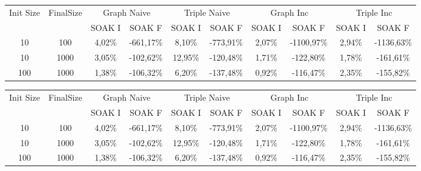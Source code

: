 \begin{sidewaystable}
	\begin{tabular}{|c|c|cc|cc|cc|cc|} %
	  	\hline
		Init Size&FinalSize &\multicolumn{2}{c}{Graph Naive}  &\multicolumn{2}{c}{Triple Naive}&\multicolumn{2}{c}{Graph Inc}  &\multicolumn{2}{c}{Triple Inc}\\\
		&& SOAK I & SOAK F& SOAK I & SOAK F& SOAK I & SOAK F& SOAK I & SOAK F\\
		\hline
		\hline
		10	&100	&4,02\%&\cellcolor[HTML]{C0C0C0}	-661,17\%&	8,10\%&\cellcolor[HTML]{C0C0C0}-773,91\%&	2,07\%&	\cellcolor[HTML]{C0C0C0}-1100,97\%&	2,94\%&\cellcolor[HTML]{C0C0C0}	-1136,63\%\\	
		10	&1000	&3,05\%&\cellcolor[HTML]{C0C0C0}	-102,62\%&	12,95\%&\cellcolor[HTML]{C0C0C0}	-120,48\%&	1,71\%&	\cellcolor[HTML]{C0C0C0}-122,80\%&	1,78\%&\cellcolor[HTML]{C0C0C0}-161,61\%	\\
		100	&1000&	1,38\%&\cellcolor[HTML]{C0C0C0}-106,32\%&	6,20\%&\cellcolor[HTML]{C0C0C0}-137,48\%&	0,92\%&\cellcolor[HTML]{C0C0C0}-116,47\%&	2,35\%&	\cellcolor[HTML]{C0C0C0}-155,82\%	\\

		\hline %
	\end{tabular}
	\caption[\textsc{Analyser} Investigation Stack - Level 1 - SOAK Test Average Latency Comparison]{Max Latency Comparison Step Response}
	\label{tab:step_latency_comparisons_max}
	

	\begin{tabular}{|c|c|cc|cc|cc|cc|} %
	  	\hline
		Init Size&FinalSize &\multicolumn{2}{c}{Graph Naive}  &\multicolumn{2}{c}{Triple Naive}&\multicolumn{2}{c}{Graph Inc}  &\multicolumn{2}{c}{Triple Inc}\\\
		&& SOAK I & SOAK F& SOAK I & SOAK F& SOAK I & SOAK F& SOAK I & SOAK F\\
		\hline
		\hline
		10	&100	&4,02\%&\cellcolor[HTML]{C0C0C0}	-661,17\%&	8,10\%&\cellcolor[HTML]{C0C0C0}	-773,91\%&	2,07\%&	\cellcolor[HTML]{C0C0C0}-1100,97\%&	2,94\%&\cellcolor[HTML]{C0C0C0}	-1136,63\%\\	
		10	&1000	&3,05\%&	\cellcolor[HTML]{C0C0C0}-102,62\%&	12,95\%&	\cellcolor[HTML]{C0C0C0}-120,48\%&	1,71\%&	\cellcolor[HTML]{C0C0C0}-122,80\%&	1,78\%&\cellcolor[HTML]{C0C0C0}	-161,61\%	\\
		100	&1000&	1,38\%&	\cellcolor[HTML]{C0C0C0}-106,32\%&	6,20\%&\cellcolor[HTML]{C0C0C0}	-137,48\%&	0,92\%&\cellcolor[HTML]{C0C0C0}	-116,47\%&	2,35\%&	\cellcolor[HTML]{C0C0C0}-155,82\%	\\

		\hline %
	\end{tabular}
	\caption[\textsc{Analyser} Investigation Stack - Level 1 - SOAK Test Average Latency Comparison]{Max Memory Comparison Step Response}
	\label{tab:step_memory_comparisons_max}

	
\end{sidewaystable}